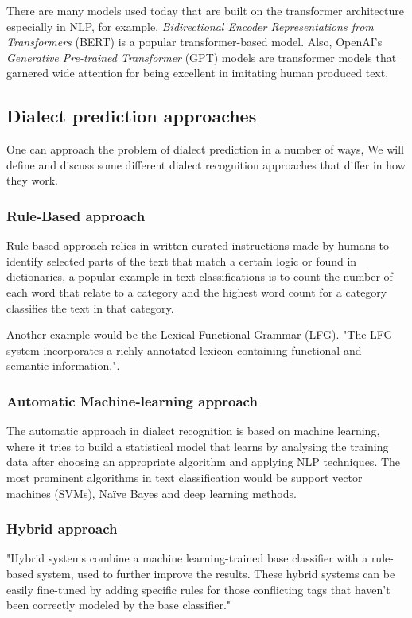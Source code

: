 \documentclass[12pt]{diazessay}
\begin{document}
        There are many models used today that are built on the transformer architecture especially in NLP, for example, \emph{Bidirectional Encoder Representations from Transformers} (BERT) is a popular transformer-based model. Also, OpenAI's \emph{Generative Pre-trained Transformer} (GPT) models are transformer models that garnered wide attention for being excellent in imitating human produced text.
        

    \subsection{Dialect prediction approaches}
        One can approach the problem of dialect prediction in a number of ways, We will define and discuss some different dialect recognition approaches that differ in how they work.

        
        \subsubsection{Rule-Based approach}
        Rule-based approach relies in written curated instructions made by humans to identify selected parts of the text that match a certain logic or found in dictionaries, a popular example in text classifications is to count the number of each word that relate to a category and the highest word count for a category classifies the text in that category. 
        
        Another example would be the Lexical Functional Grammar (LFG). "The LFG system incorporates a richly annotated lexicon containing functional and semantic information."\cite{hassan_2010}.

        
        \subsubsection{Automatic Machine-learning approach} \label{txt:simple_voting}
        The automatic approach in dialect recognition is based on machine learning, where it tries to build a statistical model that learns by analysing the training data after choosing an appropriate algorithm and applying NLP techniques. The most prominent algorithms in text classification would be support vector machines (SVMs), Naïve Bayes and deep learning methods.
        
        
        \subsubsection{Hybrid approach}
        "Hybrid systems combine a machine learning-trained base classifier with a rule-based system, used to further improve the results. These hybrid systems can be easily fine-tuned by adding specific rules for those conflicting tags that haven’t been correctly modeled by the base classifier."\cite{monkey_learn_NLP}
        
\end{document}
